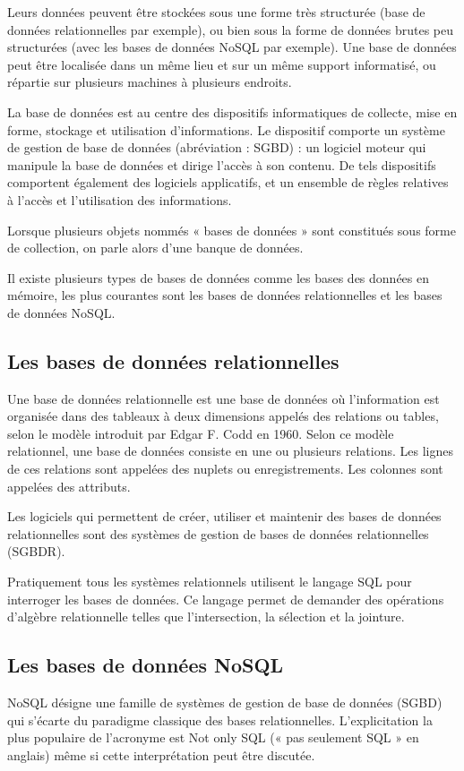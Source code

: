 Leurs données peuvent être stockées sous une forme très structurée
(base de données relationnelles par exemple), ou bien sous la forme de données brutes
peu structurées (avec les bases de données NoSQL par exemple). Une base de données peut
être localisée dans un même lieu et sur un même support informatisé, ou répartie sur
plusieurs machines à plusieurs endroits.

La base de données est au centre des dispositifs informatiques de collecte, mise en forme,
stockage et utilisation d'informations. Le dispositif comporte un système de gestion de
base de données (abréviation : SGBD) : un logiciel moteur qui manipule la base de données et
dirige l'accès à son contenu. De tels dispositifs comportent également des logiciels applicatifs, et
un ensemble de règles relatives à l'accès et l'utilisation des informations.

Lorsque plusieurs objets nommés « bases de données » sont constitués sous forme de collection,
on parle alors d'une banque de données.

Il existe plusieurs types de bases de données comme les bases des données en mémoire, les plus courantes sont les bases de données
relationnelles et les bases de données NoSQL.

\subsection{Les bases de données relationnelles}\label{subsec:base-de-donnees-relationnelles}
Une base de données relationnelle\cite{base_donnees_relationnelle} est une base de données où l'information est
organisée dans des tableaux à deux dimensions appelés des relations ou tables, selon
le modèle introduit par Edgar F. Codd en 1960. Selon ce modèle relationnel, une base de
données consiste en une ou plusieurs relations. Les lignes de ces relations sont appelées
des nuplets ou enregistrements. Les colonnes sont appelées des attributs.

Les logiciels qui permettent de créer, utiliser et maintenir des bases de données relationnelles
sont des systèmes de gestion de bases de données relationnelles (SGBDR).

Pratiquement tous les systèmes relationnels utilisent le langage SQL pour interroger les bases de
données. Ce langage permet de demander des opérations d'algèbre relationnelle telles que l'intersection,
la sélection et la jointure.

\subsection{Les bases de données NoSQL}\label{subsec:base-de-donnees-nosql}
NoSQL\cite{nosql} désigne une famille de systèmes de gestion de base de données (SGBD) qui s'écarte
du paradigme classique des bases relationnelles. L'explicitation la plus populaire de
l'acronyme est Not only SQL (« pas seulement SQL » en anglais) même si cette
interprétation peut être discutée.

